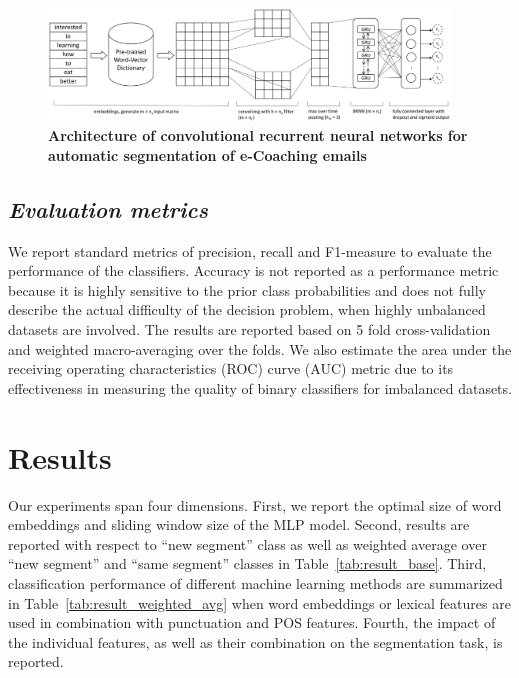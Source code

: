 \documentclass{amia}
\begin{document}
\begin{figure}[!htb]
    \centering
    \includegraphics[width=0.95\textwidth]{figures/CRNN.eps}
    \caption{\textbf{Architecture of convolutional recurrent neural networks for automatic segmentation of e-Coaching emails}}
    \label{fig:crnn}
\end{figure}
  
\subsection*{\textit{Evaluation metrics}}
We report standard metrics of precision, recall and F1-measure to evaluate the performance of the classifiers.\cite{aas1999text} Accuracy is not reported as a performance metric because it is highly sensitive to the prior class probabilities and does not fully describe the actual difficulty of the decision problem, when highly unbalanced datasets are involved. The results are reported based on 5 fold cross-validation and weighted macro-averaging over the folds. We also estimate the area under the receiving operating characteristics (ROC) curve\cite{kumar2011receiver} (AUC) metric due to its effectiveness in measuring the quality of binary classifiers for imbalanced datasets. \cite{hu2015kernelized}

\section*{Results}
Our experiments span four dimensions. First, we report the optimal size of word embeddings and sliding window size of the MLP model. Second, results are reported with respect to ``new segment'' class as well as weighted average over ``new segment'' and ``same segment'' classes in Table~\ref{tab:result_base}. Third, classification performance of different machine learning methods are summarized in Table~\ref{tab:result_weighted_avg} when word embeddings or lexical features are used in combination with punctuation and POS features. Fourth, the impact of the individual features, as well as their combination on the segmentation task, is reported.
\end{document}

